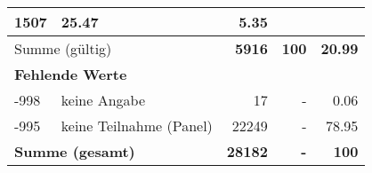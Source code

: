 \begin{longtable}{lXrrr}
       \num{1507} &
       \num[round-mode=places,round-precision=2]{25.47} &
         \num[round-mode=places,round-precision=2]{5.35} \\
     \midrule
     \multicolumn{2}{l}{Summe (gültig)} &
       \textbf{\num{5916}} &
     \textbf{100} &
       \textbf{\num[round-mode=places,round-precision=2]{20.99}} \\
     \multicolumn{5}{l}{\textbf{Fehlende Werte}}\\
       -998 &
       keine Angabe &
         \num{17} &
        - &
         \num[round-mode=places,round-precision=2]{0.06} \\
       -995 &
       keine Teilnahme (Panel) &
         \num{22249} &
        - &
         \num[round-mode=places,round-precision=2]{78.95} \\
     \midrule
     \multicolumn{2}{l}{\textbf{Summe (gesamt)}} &
          \textbf{\num{28182}} &
        \textbf{-} &
        \textbf{100} \\
     \bottomrule
     \end{longtable}
     
